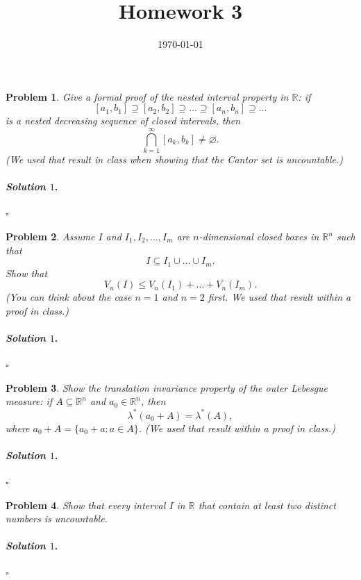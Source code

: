 \documentclass[reqno]{amsart}
\theoremstyle{plain}
\newtheorem{problem}{Problem}
\theoremstyle{definition}
\newenvironment{solution1}{\paragraph{\emph{Solution $1$}.}}{\hfill$\square$}
\begin{document}
 

\title[Homework 3]{Homework 3}

\date{\today} 
\maketitle 
 
 
\begin{problem}
Give a formal proof of the nested interval property in $\mathbb{R}$:  if 
$$[a_{1},b_{1}] \supseteq [a_{2},b_{2}] \supseteq \ldots \supseteq [a_{n},b_{n}] \supseteq \ldots$$
is a nested decreasing sequence of closed intervals, then
$$\bigcap_{k=1}^{\infty} [a_{k},b_{k}] \neq \varnothing. $$
(We used that result in class when showing that the Cantor set is uncountable.)
\end{problem}
\begin{solution1}

\end{solution1} 

\begin{problem}
Assume $I$ and $I_{1},I_{2},\ldots, I_{m}$ are $n$-dimensional closed boxes in $\mathbb{R}^{n}$ such that
$$I \subseteq I_{1} \cup \ldots \cup I_{m}.$$
Show that 
$$V_{n}(I) \le V_{n}(I_{1}) + \ldots + V_{n}(I_{m}).$$
(You can think about the case $n=1$ and $n=2$ first.  We used that result within a proof in class.)
\end{problem}
\begin{solution1}

\end{solution1}



\begin{problem}
Show the translation invariance property of the outer Lebesgue measure:  if $A \subseteq \mathbb{R}^{n}$ and $a_{0} \in \mathbb{R}^{n}$, then
$$\lambda^{*}(a_{0}+A) = \lambda^{*}(A), $$
where $a_{0}+A = \{ a_{0} + a : a \in A\}$.  (We used that result within a proof in class.)
\end{problem}
\begin{solution1}

\end{solution1}


\begin{problem}
Show that every interval $I$ in $\mathbb{R}$ that contain at least two distinct numbers is uncountable.
\end{problem}
\begin{solution1}

\end{solution1}
\end{document}
